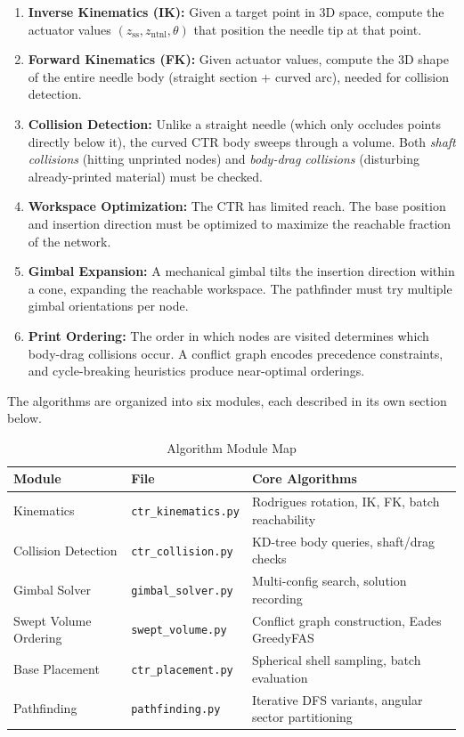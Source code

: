 \documentclass[11pt,a4paper]{article}
\newcommand{\filename}[1]{\texttt{\textcolor{accentblue}{#1}}}
\begin{document}
\begin{enumerate}[label=\textbf{\arabic*.}]
    \item \textbf{Inverse Kinematics (IK):} Given a target point in 3D space, compute the actuator values $(z_\text{ss}, z_\text{ntnl}, \theta)$ that position the needle tip at that point.
    \item \textbf{Forward Kinematics (FK):} Given actuator values, compute the 3D shape of the entire needle body (straight section + curved arc), needed for collision detection.
    \item \textbf{Collision Detection:} Unlike a straight needle (which only occludes points directly below it), the curved CTR body sweeps through a volume. Both \emph{shaft collisions} (hitting unprinted nodes) and \emph{body-drag collisions} (disturbing already-printed material) must be checked.
    \item \textbf{Workspace Optimization:} The CTR has limited reach. The base position and insertion direction must be optimized to maximize the reachable fraction of the network.
    \item \textbf{Gimbal Expansion:} A mechanical gimbal tilts the insertion direction within a cone, expanding the reachable workspace. The pathfinder must try multiple gimbal orientations per node.
    \item \textbf{Print Ordering:} The order in which nodes are visited determines which body-drag collisions occur. A conflict graph encodes precedence constraints, and cycle-breaking heuristics produce near-optimal orderings.
\end{enumerate}

\noindent The algorithms are organized into six modules, each described in its own section below.

\begin{table}[H]
\centering
\caption{Algorithm Module Map}
\begin{tabular}{llp{5.5cm}}
\toprule
\textbf{Module} & \textbf{File} & \textbf{Core Algorithms} \\
\midrule
Kinematics & \filename{ctr\_kinematics.py} & Rodrigues rotation, IK, FK, batch reachability \\
Collision Detection & \filename{ctr\_collision.py} & KD-tree body queries, shaft/drag checks \\
Gimbal Solver & \filename{gimbal\_solver.py} & Multi-config search, solution recording \\
Swept Volume Ordering & \filename{swept\_volume.py} & Conflict graph construction, Eades GreedyFAS \\
Base Placement & \filename{ctr\_placement.py} & Spherical shell sampling, batch evaluation \\
Pathfinding & \filename{pathfinding.py} & Iterative DFS variants, angular sector partitioning \\
\bottomrule
\end{tabular}
\end{table}
\end{document}
